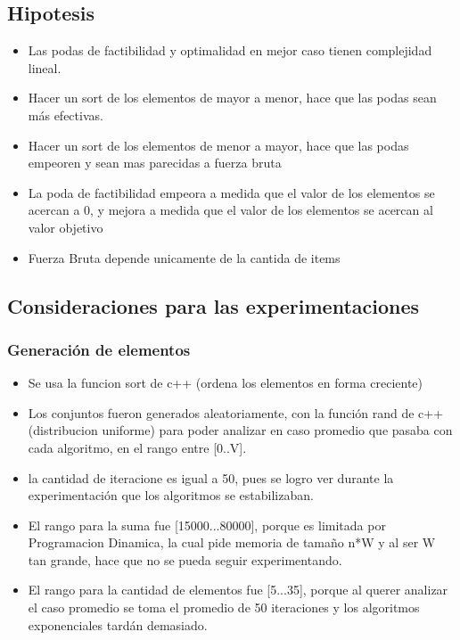\subsection{Hipotesis}
\begin{itemize}
	\item Las podas de factibilidad y optimalidad en mejor caso tienen complejidad lineal.
	\item Hacer un sort de los elementos de mayor a menor, hace que las podas sean m\'as efectivas.
	\item Hacer un sort de los elementos de menor a mayor, hace que las podas empeoren y sean mas parecidas a fuerza bruta
	\item La poda de factibilidad empeora a medida que el valor de los elementos se acercan a 0, y mejora a medida que el valor de los elementos se acercan al valor objetivo
	\item Fuerza Bruta depende unicamente de la cantida de items
\end{itemize}
\subsection{Consideraciones para las experimentaciones}
\subsubsection{Generaci\'on de elementos}
\begin{itemize}
	\item Se usa la funcion sort de c++ (ordena los elementos en forma creciente)
	\item Los conjuntos fueron generados aleatoriamente, con la funci\'on rand de c++ (distribucion uniforme) para poder analizar en caso promedio que pasaba con cada algoritmo, en el rango entre [0..V].
	\item la cantidad de iteracione es igual a 50, pues se logro ver durante la experimentaci\'on que los algoritmos se estabilizaban.
	\item El rango para la suma fue [15000...80000], porque es limitada por Programacion Dinamica, la cual pide memoria de tamaño n*W y al ser W tan grande, hace que no se pueda seguir experimentando.
	\item El rango para la cantidad de elementos fue [5...35], porque al querer analizar el caso promedio se toma el promedio de 50 iteraciones y los algoritmos exponenciales tard\'an demasiado.
\end{itemize}
